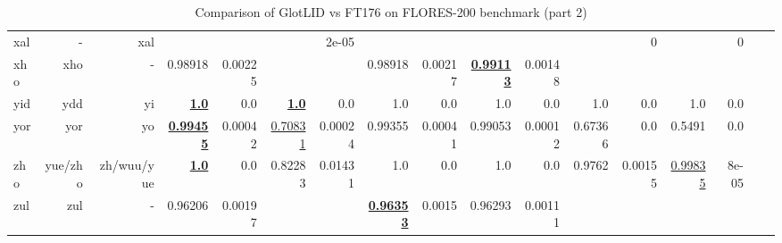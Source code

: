 \documentclass[11pt]{article}
\def\flores{FLORES\xspace}
\def\ft176{FT176\xspace}
\begin{document}
\begin{table*}[h]
{\begin{tabular}{lrrrrrrrrrrrrrrrr}
xal         & -         & xal         &          &          &          & 2e-05         &          &          &          &          &          & 0         &          & 0         \\
xho         & xho         & -         & 0.98918         & 0.00225         &          &          & 0.98918         & 0.00217         & \textbf{\underline{0.99113}}         & 0.00148         &          &          &          &          \\
yid         & ydd         & yi         & \textbf{\underline{1.0}}         & 0.0         & \textbf{\underline{1.0}}         & 0.0         & 1.0         & 0.0         & 1.0         & 0.0         & 1.0         & 0.0         & 1.0         & 0.0         \\
yor         & yor         & yo         & \textbf{\underline{0.99455}}         & 0.00042         & \underline{0.70831}         & 0.00024         & 0.99355         & 0.00041         & 0.99053         & 0.00012         & 0.67366         & 0.0         & 0.5491         & 0.0         \\
zho         & yue/zho         & zh/wuu/yue         & \textbf{\underline{1.0}}         & 0.0         & 0.82283         & 0.01431         & 1.0         & 0.0         & 1.0         & 0.0         & 0.9762         & 0.00155         & \underline{0.99835}         & 8e-05         \\
zul         & zul         & -         & 0.96206         & 0.00197         &          &          & \textbf{\underline{0.96353}}         & 0.0015         & 0.96293         & 0.00111         &          &          &          &          \\
\end{tabular}
}
\caption{Comparison of GlotLID vs \ft176 on \flores-200 benchmark (part 2)}
\label{tab:appendix_glotlid_ft176_floress_2}
\end{table*}
 
\end{document}
